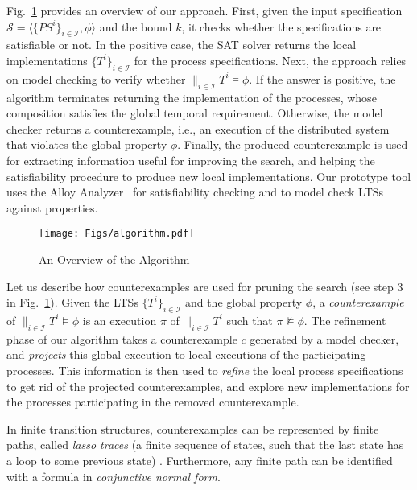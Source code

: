 \iffalse
Fig.~\ref{fig:algorithm} provides an overview of our approach. First, given the input specification $\mathcal{S} = \langle \{ \textit{PS}^i \}_{i \in \mathcal{I}}, \phi \rangle$ and the bound $k$, it checks whether the specifications are satisfiable or not. In the positive case, the SAT solver returns the local implementations $\{ T^i \}_{i \in \mathcal{I}}$ for the process specifications. Next, the approach relies on model checking to verify whether $\parallel_{i \in \mathcal{I}} T^i \models \phi$. If the answer is positive, the algorithm terminates returning the implementation of the processes, whose composition satisfies the global temporal requirement. Otherwise, the model checker returns a counterexample, i.e., an execution of the distributed system that violates the global property $\phi$. Finally, the produced counterexample is used for extracting information useful for improving the search, and helping the satisfiability procedure to produce new local implementations. Our prototype tool uses the Alloy Analyzer~\cite{AlloyBook} for satisfiability checking and {\NuSMV} \cite{Cimatti+2002} to model check LTSs against properties. 

\begin{figure}[t!]
\centering
\texttt{[image: Figs/algorithm.pdf]} %
\caption{An Overview of the Algorithm}
\label{fig:algorithm}
\end{figure}

Let us describe how counterexamples are used for pruning the search (see step 3 in Fig.~\ref{fig:algorithm}). Given the LTSs $\{ T^i \}_{i \in \mathcal{I}}$ and the global {\LTLX} property $\phi$, a \emph{counterexample} of $\parallel_{i \in \mathcal{I}} T^i \models \phi$ is an execution $\pi$ of $\parallel_{i \in \mathcal{I}} T^i$ such that $\pi \nvDash \phi$. The refinement phase of our algorithm takes a counterexample $c$ generated by a model checker, and \emph{projects} this global execution to local executions of the participating processes. This information is then used to \emph{refine} the local process specifications to get rid of the projected counterexamples, and explore new implementations for the processes participating in the removed counterexample.

In finite transition structures, counterexamples can be represented by finite paths, called \emph{lasso traces} (a finite sequence of states, such that the last state has a loop to some previous state) \cite{Biere+1999}. Furthermore, any finite path can be identified with a formula in \emph{conjunctive normal form}. 

